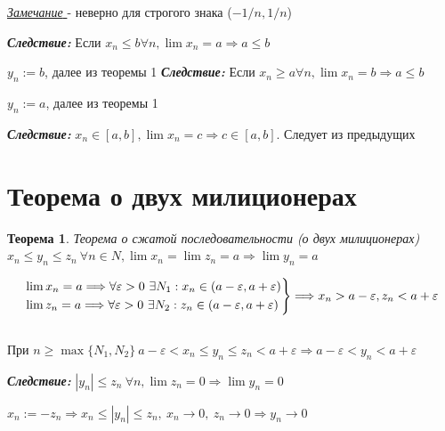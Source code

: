 \documentclass[12pt,letterpaper]{report}
\makeatletter
\newtheorem*{theorem-non}{Теорема}
\theoremstyle{definition}
\newcommand{\follow}{\textbf{\textit{Следствие:}}}
\newcommand{\notice}{\underline{\textit{Замечание }}}
\renewenvironment{proof}[1][\proofname]{%
   \par\pushQED{\qed}\normalfont%
   \topsep6\p@\@plus6\p@\relax
   \trivlist\item[\hskip\labelsep\bfseries#1\@addpunct{.}]%
   \ignorespaces
}{%
   \popQED\endtrivlist\@endpefalse
}
\makeatother
\begin{document}
    \notice - неверно для строгого знака ($-1/n, 1/n$)
    
    \follow \; Если $x_n \leq b \forall n, \lim x_n = a \Longrightarrow a\leq b$
    \begin{proof}
        $y_n:=b$, далее из теоремы 1
    \end{proof}
    \newpage
    \follow \; Если $x_n \geq a \forall n, \lim x_n = b \Longrightarrow a \leq b$

    \begin{proof}
        $y_n:=a$, далее из теоремы 1
    \end{proof}
    
    \follow \; $x_n \in [a, b], \lim x_n = c \Longrightarrow c \in [a, b]$. 
    Следует из предыдущих
    
    \section{Теорема о двух милиционерах}
    
    
    \begin{theorem-non}
        Теорема о сжатой последовательности (о двух милиционерах) \\
        $x_n \leq y_n \leq z_n\ \forall n\in N, \lim x_n = \lim z_n = a \Longrightarrow \lim y_n = a$
    \end{theorem-non}
    \begin{proof}
        \[
    \begin{drcases}
    \lim x_n = a \Longrightarrow \forall \varepsilon>0\ \exists N_1: x_n\in (a-\varepsilon, a+\varepsilon)\\
    \lim z_n = a \Longrightarrow \forall \varepsilon>0\  \exists N_2: z_n\in (a-\varepsilon, a+\varepsilon)
    \end{drcases}
    \Longrightarrow x_n > a-\varepsilon, z_n<a+\varepsilon 
    \] \\
    При $n\geq \max\{N_1, N_2\}\ a-\varepsilon<x_n\leq y_n \leq z_n<a+\varepsilon \Longrightarrow a-\varepsilon<y_n<a+\varepsilon$\\
    \end{proof}
    
    \follow \; $|y_n|\leq z_n\ \forall n, \lim z_n = 0 \Longrightarrow \lim y_n = 0$
    
    \begin{proof}
        $x_n:=-z_n \Longrightarrow x_n \leq |y_n| \leq z_n,\ x_n \to 0,\ z_n \to 0 \Longrightarrow y_n \to 0$
    \end{proof}
    
\end{document}
